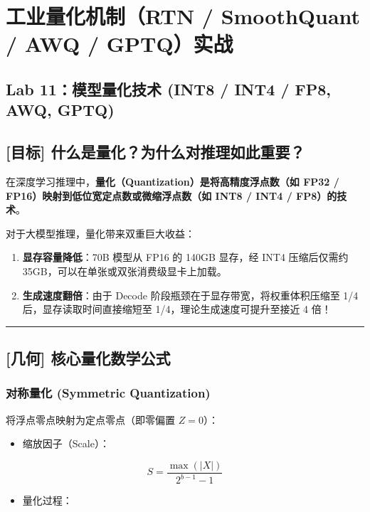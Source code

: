 \chapter{工业量化机制（RTN / SmoothQuant / AWQ / GPTQ）实战}

\section{Lab 11：模型量化技术 (INT8 / INT4 / FP8, AWQ, GPTQ)}

\section{[目标] 什么是量化？为什么对推理如此重要？}

在深度学习推理中，\textbf{量化（Quantization）是将高精度浮点数（如 FP32 / FP16）映射到低位宽定点数或微缩浮点数（如 INT8 / INT4 / FP8）的技术}。

对于大模型推理，量化带来双重巨大收益：
\begin{enumerate}
  \item \textbf{显存容量降低}：70B 模型从 FP16 的 140GB 显存，经 INT4 压缩后仅需约 35GB，可以在单张或双张消费级显卡上加载。
  \item \textbf{生成速度翻倍}：由于 Decode 阶段瓶颈在于显存带宽，将权重体积压缩至 1/4 后，显存读取时间直接缩短至 1/4，理论生成速度可提升至接近 4 倍！
\end{enumerate}

\vspace{0.8em}\hrule\vspace{0.8em}

\section{[几何] 核心量化数学公式}

\subsection{对称量化 (Symmetric Quantization)}

将浮点零点映射为定点零点（即零偏置 $Z = 0$）：
\begin{itemize}
  \item 缩放因子（Scale）：
\end{itemize}

\[
S = \frac{\max(|X|)}{2^{b-1} - 1}
\]

\begin{itemize}
  \item 量化过程：
\end{itemize}

